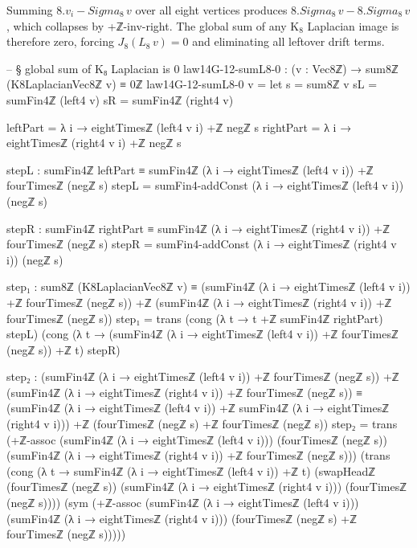 \documentclass[11pt,a4paper]{book}
\def\Sigma{Sigma}%
\def\cdot{.}%
\def\texttt#1{#1}%
\begin{document}
Summing $8 \cdot v_i - \Sigma_8\,v$ over all eight vertices produces $8 \cdot \Sigma_8\,v - 8 \cdot \Sigma_8\,v$, which collapses by \texttt{+ℤ-inv-right}. The global sum of any K$_8$ Laplacian image is therefore zero, forcing $J_8 (L_8\,v) = 0$ and eliminating all leftover drift terms.

\begin{code}
-- § global sum of K₈ Laplacian is 0
law14G-12-sumL8-0 : (v : Vec8ℤ) → sum8ℤ (K8LaplacianVec8ℤ v) ≡ 0ℤ
law14G-12-sumL8-0 v =
  let
    s  = sum8ℤ v
    sL = sumFin4ℤ (left4 v)
    sR = sumFin4ℤ (right4 v)

    leftPart  = λ i → eightTimesℤ (left4 v i) +ℤ negℤ s
    rightPart = λ i → eightTimesℤ (right4 v i) +ℤ negℤ s

    stepL : sumFin4ℤ leftPart ≡ sumFin4ℤ (λ i → eightTimesℤ (left4 v i)) +ℤ fourTimesℤ (negℤ s)
    stepL = sumFin4-addConst (λ i → eightTimesℤ (left4 v i)) (negℤ s)

    stepR : sumFin4ℤ rightPart ≡ sumFin4ℤ (λ i → eightTimesℤ (right4 v i)) +ℤ fourTimesℤ (negℤ s)
    stepR = sumFin4-addConst (λ i → eightTimesℤ (right4 v i)) (negℤ s)

    step₁ : sum8ℤ (K8LaplacianVec8ℤ v) ≡
            (sumFin4ℤ (λ i → eightTimesℤ (left4 v i)) +ℤ fourTimesℤ (negℤ s)) +ℤ
            (sumFin4ℤ (λ i → eightTimesℤ (right4 v i)) +ℤ fourTimesℤ (negℤ s))
    step₁ =
      trans
        (cong (λ t → t +ℤ sumFin4ℤ rightPart) stepL)
        (cong (λ t → (sumFin4ℤ (λ i → eightTimesℤ (left4 v i)) +ℤ fourTimesℤ (negℤ s)) +ℤ t) stepR)

    step₂ : (sumFin4ℤ (λ i → eightTimesℤ (left4 v i)) +ℤ fourTimesℤ (negℤ s)) +ℤ
            (sumFin4ℤ (λ i → eightTimesℤ (right4 v i)) +ℤ fourTimesℤ (negℤ s)) ≡
            (sumFin4ℤ (λ i → eightTimesℤ (left4 v i)) +ℤ sumFin4ℤ (λ i → eightTimesℤ (right4 v i))) +ℤ
            (fourTimesℤ (negℤ s) +ℤ fourTimesℤ (negℤ s))
    step₂ =
      trans
        (+ℤ-assoc (sumFin4ℤ (λ i → eightTimesℤ (left4 v i))) (fourTimesℤ (negℤ s))
                 (sumFin4ℤ (λ i → eightTimesℤ (right4 v i)) +ℤ fourTimesℤ (negℤ s)))
        (trans
          (cong (λ t → sumFin4ℤ (λ i → eightTimesℤ (left4 v i)) +ℤ t)
                (swapHeadℤ (fourTimesℤ (negℤ s)) (sumFin4ℤ (λ i → eightTimesℤ (right4 v i)))
                           (fourTimesℤ (negℤ s))))
          (sym (+ℤ-assoc (sumFin4ℤ (λ i → eightTimesℤ (left4 v i)))
                         (sumFin4ℤ (λ i → eightTimesℤ (right4 v i)))
                         (fourTimesℤ (negℤ s) +ℤ fourTimesℤ (negℤ s)))))


\end{code}
\end{document}
